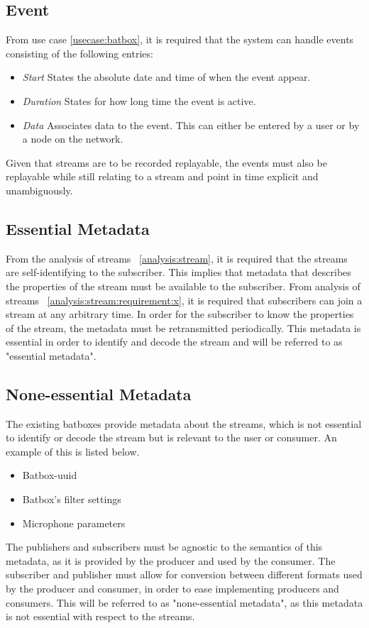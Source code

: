 \subsection{Event}
From use case \ref{usecase:batbox}, it is required that the system can handle events consisting of the following entries:
\begin{itemize}
	\item \textit{Start} States the absolute date and time of when the event appear. 
	\item \textit{Duration} States for how long time the event is active.
	\item \textit{Data} Associates data to the event. This can either be entered by a user or by a node on the network.
\end{itemize}

Given that streams are to be recorded replayable, the events must also be replayable while still relating to a stream and point in time explicit and unambiguously.

\subsection{Essential Metadata}
From the analysis of streams ~\ref{analysis:stream}, it is required that the streams are self-identifying to the subscriber. This implies that metadata that describes the properties of the stream must be available to the subscriber.
From analysis of streams ~\ref{analysis:stream:requirement:x}, it is required that subscribers can join a stream at any arbitrary time. In order for the subscriber to know the properties of the stream, the metadata must be retransmitted periodically. This metadata is essential in order to identify and decode the stream and will be referred to as "essential metadata".\\

\subsection{None-essential Metadata}
The existing batboxes provide metadata about the streams, which is not essential to identify or decode the stream but is relevant to the user or consumer. An example of this is listed below.
\begin{itemize}
	\item Batbox-uuid
	\item Batbox's filter settings
	\item Microphone parameters
\end{itemize} 
The publishers and subscribers must be agnostic to the semantics of this metadata, as it is provided by the producer and used by the consumer. The subscriber and publisher must allow for conversion between different formats used by the producer and consumer, in order to ease implementing producers and consumers.
This will be referred to as "none-essential metadata", as this metadata is not essential with respect to the streams.\\

